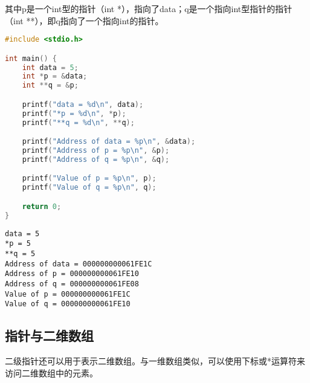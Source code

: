 其中p是一个int型的指针（int *），指向了data；q是一个指向int型指针的指针（int **），即q指向了一个指向int的指针。\\


\begin{lstlisting}[language=C]
#include <stdio.h>

int main() {
    int data = 5;
    int *p = &data;
    int **q = &p;

    printf("data = %d\n", data);
    printf("*p = %d\n", *p);
    printf("**q = %d\n", **q);

    printf("Address of data = %p\n", &data);
    printf("Address of p = %p\n", &p);
    printf("Address of q = %p\n", &q);

    printf("Value of p = %p\n", p);
    printf("Value of q = %p\n", q);

    return 0;
}
\end{lstlisting}

\begin{tcolorbox}
    \begin{verbatim}
data = 5
*p = 5
**q = 5
Address of data = 000000000061FE1C
Address of p = 000000000061FE10
Address of q = 000000000061FE08
Value of p = 000000000061FE1C
Value of q = 000000000061FE10
	\end{verbatim}
\end{tcolorbox}

\vspace{0.5cm}

\subsection{指针与二维数组}

二级指针还可以用于表示二维数组。与一维数组类似，可以使用下标或*运算符来访问二维数组中的元素。\\

\begin{figure}[H]
    \centering
\end{figure}

